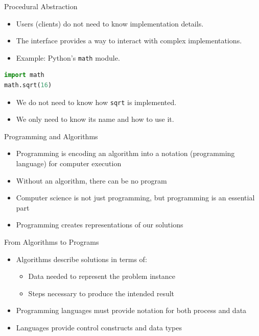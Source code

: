 \documentclass{beamer}
\begin{document}
\begin{frame}[fragile]{Procedural Abstraction}
    \begin{itemize}
        \item Users (clients) do not need to know implementation details.
        \item The interface provides a way to interact with complex implementations.
        \item Example: Python's \texttt{math} module.
    \end{itemize}

    \vspace{0.5cm} %

    
    \begin{lstlisting}[style=colorful, language=Python]
import math
math.sqrt(16)
    \end{lstlisting}

    \vspace{0.5cm} %

    \begin{itemize}
        \item We do not need to know how \texttt{sqrt} is implemented.
        \item We only need to know its name and how to use it.
    \end{itemize}
\end{frame}

\begin{frame}{Programming and Algorithms}
    \begin{itemize}
        \item Programming is encoding an algorithm into a notation (programming language) for computer execution
        \item Without an algorithm, there can be no program
        \item Computer science is not just programming, but programming is an essential part
        \item Programming creates representations of our solutions
    \end{itemize}
\end{frame}

\begin{frame}{From Algorithms to Programs}
    \begin{itemize}
        \item Algorithms describe solutions in terms of:
        \begin{itemize}
            \item Data needed to represent the problem instance
            \item Steps necessary to produce the intended result
        \end{itemize}
        \item Programming languages must provide notation for both process and data
        \item Languages provide control constructs and data types
    \end{itemize}
\end{frame}
\end{document}
